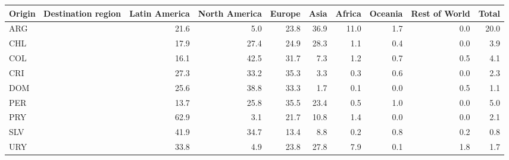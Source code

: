 \begin{tabular}{lrrrrrrrr}
\toprule
Origin \ Destination region & Latin America & North America & Europe & Asia & Africa & Oceania & Rest of World & Total \\
\midrule
ARG & 21.6 & 5.0 & 23.8 & 36.9 & 11.0 & 1.7 & 0.0 & 20.0 \\
CHL & 17.9 & 27.4 & 24.9 & 28.3 & 1.1 & 0.4 & 0.0 & 3.9 \\
COL & 16.1 & 42.5 & 31.7 & 7.3 & 1.2 & 0.7 & 0.5 & 4.1 \\
CRI & 27.3 & 33.2 & 35.3 & 3.3 & 0.3 & 0.6 & 0.0 & 2.3 \\
DOM & 25.6 & 38.8 & 33.3 & 1.7 & 0.1 & 0.0 & 0.5 & 1.1 \\
PER & 13.7 & 25.8 & 35.5 & 23.4 & 0.5 & 1.0 & 0.0 & 5.0 \\
PRY & 62.9 & 3.1 & 21.7 & 10.8 & 1.4 & 0.0 & 0.0 & 2.1 \\
SLV & 41.9 & 34.7 & 13.4 & 8.8 & 0.2 & 0.8 & 0.2 & 0.8 \\
URY & 33.8 & 4.9 & 23.8 & 27.8 & 7.9 & 0.1 & 1.8 & 1.7 \\
\bottomrule
\end{tabular}
